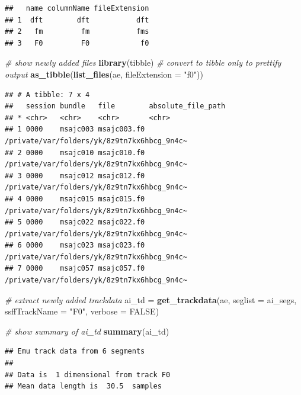 \documentclass[]{book}
\newenvironment{Shaded}{\begin{snugshade}}{\end{snugshade}}
\newcommand{\CommentTok}[1]{\textcolor[rgb]{0.56,0.35,0.01}{\textit{#1}}}
\newcommand{\DataTypeTok}[1]{\textcolor[rgb]{0.13,0.29,0.53}{#1}}
\newcommand{\KeywordTok}[1]{\textcolor[rgb]{0.13,0.29,0.53}{\textbf{#1}}}
\newcommand{\NormalTok}[1]{#1}
\newcommand{\OtherTok}[1]{\textcolor[rgb]{0.56,0.35,0.01}{#1}}
\newcommand{\StringTok}[1]{\textcolor[rgb]{0.31,0.60,0.02}{#1}}
\theoremstyle{definition}
\theoremstyle{definition}
\theoremstyle{definition}
\theoremstyle{remark}
\begin{document}
\begin{verbatim}
##   name columnName fileExtension
## 1  dft        dft           dft
## 2   fm         fm           fms
## 3   F0         F0            f0
\end{verbatim}

\begin{Shaded}
\begin{Highlighting}[]
\CommentTok{# show newly added files}
\KeywordTok{library}\NormalTok{(tibble) }\CommentTok{# convert to tibble only to prettify output}
\KeywordTok{as_tibble}\NormalTok{(}\KeywordTok{list_files}\NormalTok{(ae, }\DataTypeTok{fileExtension =} \StringTok{"f0"}\NormalTok{))}
\end{Highlighting}
\end{Shaded}

\begin{verbatim}
## # A tibble: 7 x 4
##   session bundle   file        absolute_file_path                         
## * <chr>   <chr>    <chr>       <chr>                                      
## 1 0000    msajc003 msajc003.f0 /private/var/folders/yk/8z9tn7kx6hbcg_9n4c~
## 2 0000    msajc010 msajc010.f0 /private/var/folders/yk/8z9tn7kx6hbcg_9n4c~
## 3 0000    msajc012 msajc012.f0 /private/var/folders/yk/8z9tn7kx6hbcg_9n4c~
## 4 0000    msajc015 msajc015.f0 /private/var/folders/yk/8z9tn7kx6hbcg_9n4c~
## 5 0000    msajc022 msajc022.f0 /private/var/folders/yk/8z9tn7kx6hbcg_9n4c~
## 6 0000    msajc023 msajc023.f0 /private/var/folders/yk/8z9tn7kx6hbcg_9n4c~
## 7 0000    msajc057 msajc057.f0 /private/var/folders/yk/8z9tn7kx6hbcg_9n4c~
\end{verbatim}

\begin{Shaded}
\begin{Highlighting}[]
\CommentTok{# extract newly added trackdata}
\NormalTok{ai_td =}\StringTok{ }\KeywordTok{get_trackdata}\NormalTok{(ae,}
                      \DataTypeTok{seglist =}\NormalTok{ ai_segs,}
                      \DataTypeTok{ssffTrackName =} \StringTok{"F0"}\NormalTok{,}
                      \DataTypeTok{verbose =} \OtherTok{FALSE}\NormalTok{)}

\CommentTok{# show summary of ai_td}
\KeywordTok{summary}\NormalTok{(ai_td)}
\end{Highlighting}
\end{Shaded}

\begin{verbatim}
## Emu track data from 6 segments
## 
## Data is  1 dimensional from track F0 
## Mean data length is  30.5  samples
\end{verbatim}
\end{document}
